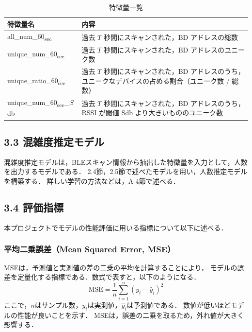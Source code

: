 \begin{table}[tb]
	\centering
	\caption{特徴量一覧}
	\label{tbl:feastures}
	\small
	\doublerulesep=0.3pt
    \begin{tabular}{l|p{5cm}} \hline\hline\hline
		特徴量名 & 内容 \\ \hline
		all\_num\_60\textsubscript{sec} & 過去 $T$ 秒間にスキャンされた，BD アドレスの総数\\ \hline
    unique\_num\_60\textsubscript{sec} & 過去 $T$ 秒間にスキャンされた，BD アドレスのユニーク数 \\ \hline
    unique\_ratio\_60\textsubscript{sec} & 過去 $T$ 秒間にスキャンされた，BD アドレスのうち，ユニークなデバイスの占める割合（ユニーク数 / 総数） \\ \hline
    unique\_num\_60\textsubscript{sec}\_$S$db & 過去 $T$ 秒間にスキャンされた，BD アドレスのうち，RSSI が閾値 Sdb より大きいもののユニーク数 \\ \hline\hline\hline
	\end{tabular}
\end{table}

\subsection*{3.3 混雑度推定モデル}
混雑度推定モデルは，BLEスキャン情報から抽出した特徴量を入力として，人数を出力するモデルである．
2.4節，2.5節で述べたモデルを用い，人数推定モデルを構築する．
詳しい学習の方法などは，A-4節で述べる．

\subsection*{3.4 評価指標}
本プロジェクトでモデルの性能評価に用いる指標について以下に述べる．

\subsubsection*{平均二乗誤差（Mean Squared Error, MSE）}
MSEは，予測値と実測値の差の二乗の平均を計算することにより，
モデルの誤差を定量化する指標である．数式で表すと，以下のようになる．
\begin{equation}
  \label{eq:mse}
  \mathrm{MSE} = \frac{1}{n} \sum_{i=1}^{n} (y_i - \hat{y}_i)^2
\end{equation}
ここで，$n$はサンプル数，$y_i$は実測値，$\hat{y}_i$は予測値である．
数値が低いほどモデルの性能が良いことを示す．
MSEは，誤差の二乗を取るため，外れ値が大きく影響する．

